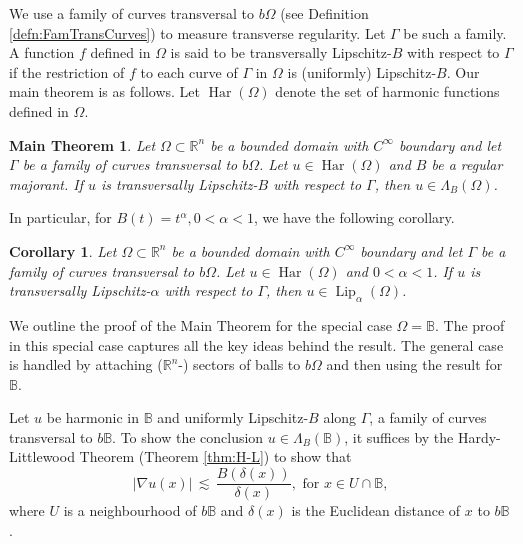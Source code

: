 \documentclass[12pt,a4paper]{amsart}
\numberwithin{equation}{section}
\newtheorem*{mainthm}{Main Theorem}
\newtheorem{cor}[equation]{Corollary}
\theoremstyle{definition}
\begin{document}
We use a family of curves transversal to $b\Omega$ (see Definition \ref{defn:FamTransCurves}) to measure transverse regularity. Let $\Gamma$ be such a family. A function $f$ defined in $\Omega$ is said to be transversally 
Lipschitz-$B$ with respect to $\Gamma$ if the restriction of $f$ to each curve of $\Gamma$ in $\Omega$ is (uniformly) Lipschitz-$B$. Our main theorem is as follows. Let $\operatorname{\operatorname{Har}}(\Omega)$ denote the set of 
harmonic functions defined in $\Omega$.

\begin{mainthm} Let $\Omega \subset \mathbb{R}^n$ be a bounded domain with $C^\infty$ boundary and let $\Gamma$ be a family of curves transversal to $b\Omega$. Let $u\in\operatorname{\operatorname{Har}}(\Omega)$ and 
$B$ be a regular majorant. If $u$ is transversally Lipschitz-$B$ with respect to $\Gamma$, then $u\in\Lambda_B(\Omega)$.
\end{mainthm}
In particular, for $B(t)=t^\alpha, 0<\alpha <1$, we have the following corollary.
\begin{cor} Let $\Omega \subset \mathbb{R}^n$ be a bounded domain with $C^\infty$ boundary and let $\Gamma$ be a family of curves transversal to $b\Omega$. Let $u\in\operatorname{\operatorname{Har}}(\Omega)$ and 
$0<\alpha<1$. If $u$ is transversally Lipschitz-$\alpha$ with respect to $\Gamma$, then $u\in\operatorname{\operatorname{Lip}}_\alpha(\Omega)$.
\end{cor}
We outline the proof of the Main Theorem for the special case $\Omega=\mathbb{B}$. The proof in this special case captures all the key ideas behind the result. The general case is handled by attaching 
($\mathbb{R}^n$-) sectors of balls to $b\Omega$ and then using the result for $\mathbb{B}$. 

Let $u$ be harmonic in $\mathbb{B}$ and uniformly Lipschitz-$B$ along $\Gamma$, a family of curves transversal to $b\mathbb{B}$. To show the conclusion $u\in\Lambda_B(\mathbb{B})$, it suffices by the 
Hardy-Littlewood Theorem (Theorem \ref{thm:H-L}) to show that
\[{\left\lvert{\nabla u(x)}\right\rvert} \,\lesssim\, \frac{B(\delta(x))}{\delta(x)}, \text{ for } x\in U\cap\mathbb{B},\]
where $U$ is a neighbourhood of $b\mathbb{B}$ and $\delta(x)$ is the Euclidean distance of $x$ to $b\mathbb{B}$.
\end{document}
